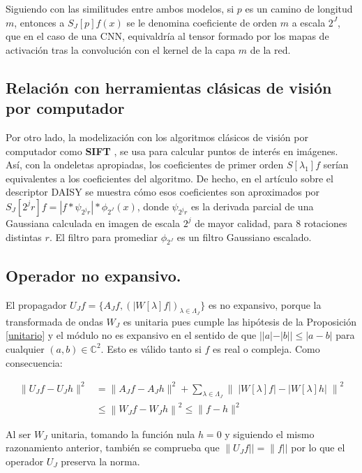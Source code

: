 \medskip

\noindent Siguiendo con las similitudes entre ambos modelos, si $p$ es un camino de longitud $m$, entonces a $S_J[p] f(x)$ se le denomina coeficiente de orden $m$ a escala $2^J$, que en el caso de una CNN, equivaldría al tensor formado por los mapas de activación tras la convolución con el kernel de la capa $m$ de la red. 

\medskip


\subsection{Relación con herramientas clásicas de visión por computador}
\noindent Por otro lado, la modelización  con los algoritmos clásicos de visión por computador como \textbf{SIFT}  \cite{DistinctiveImageFeatures}, se usa para calcular puntos de interés en imágenes. Así, con la ondeletas apropiadas, los coeficientes de primer orden $S[\lambda_1] f$ serían equivalentes a los coeficientes del algoritmo. De hecho, en el artículo sobre el descriptor DAISY \cite{Daisy} se muestra cómo esos coeficientes son aproximados por $S_J[2^j r] f= | f \ast \psi_{2^j r} | \ast \phi_{2^J}(x)$, donde $\psi_{2^j r}$ es la derivada parcial de una Gaussiana calculada en imagen de escala $2^j$ de mayor calidad, para 8 rotaciones distintas $r$. El filtro para promediar $\phi_{2^J}$ es un filtro Gaussiano escalado.


\subsection{Operador no expansivo.}

\noindent El propagador $U_Jf=\lbrace A_Jf, \left(\left| W[\lambda]f\right|\right)_{\lambda\in\Lambda_J} \rbrace$ es no expansivo, porque la transformada de ondas $W_J$ es unitaria pues cumple las hipótesis de la Proposición \ref{unitario} y el módulo no es expansivo en el sentido de que $||a|-|b||\leq |a-b|$ para cualquier $(a,b)\in \mathbb{C}^2$. Esto es válido tanto si $f$ es real o compleja. Como consecuencia: 

\begin{align*} 
    \|U_J f-U_J h\|^2 &= \|A_J f-A_J h\|^2+\sum_{\lambda\in\Lambda_J} \left\| \; |W[\lambda]f|-|W[\lambda]h| \; \right\|^2 \\
    &\leq \left\| W_J f- W_J h \right\|^2 \leq \|f-h\|^2
\end{align*}

\noindent Al ser $W_J$ unitaria, tomando la función nula $h=0$ y siguiendo el mismo razonamiento anterior, también se comprueba que $\|U_J f||=\|f||$ por lo que el operador $U_J$ preserva la norma.

